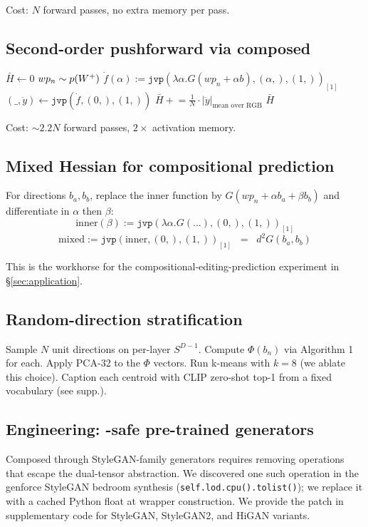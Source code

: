 Cost: $N$ forward passes, no extra memory per pass.

\subsection{Second-order pushforward via composed \jvp}
\begin{algorithmic}
\STATE $\bar H \leftarrow 0$
  \STATE $wp_n \sim p(W^+)$
  \STATE $\dot f(\alpha) := \texttt{jvp}(\lambda\alpha. G(wp_n + \alpha b), (\alpha,), (1,))_{[1]}$
  \STATE $(\_, \ddot y) \leftarrow \texttt{jvp}(\dot f, (0,), (1,))$
  \STATE $\bar H \mathrel{+}= \tfrac{1}{N} \cdot |\ddot y|_{\text{mean over RGB}}$
\ENDFOR
\RETURN $\bar H$
\end{algorithmic}

Cost: $\sim 2.2 N$ forward passes, $2\times$ activation memory.

\subsection{Mixed Hessian for compositional prediction}
For directions $b_a, b_b$, replace the inner function by
$G(wp_n + \alpha b_a + \beta b_b)$ and differentiate in $\alpha$ then
$\beta$:
\begin{equation*}
  \mathrm{inner}(\beta) := \texttt{jvp}(\lambda \alpha. G(\ldots), (0,), (1,))_{[1]}
\end{equation*}
\begin{equation*}
  \mathrm{mixed} := \texttt{jvp}(\mathrm{inner}, (0,), (1,))_{[1]} \;\;=\;\; d^2 G(b_a, b_b)
\end{equation*}

This is the workhorse for the compositional-editing-prediction
experiment in \S\ref{sec:application}.

\subsection{Random-direction stratification}
\begin{algorithmic}
\STATE Sample $N$ unit directions on per-layer $S^{D-1}$.
\STATE Compute $\Phi(b_n)$ via Algorithm 1 for each.
\STATE Apply PCA-32 to the $\Phi$ vectors.
\STATE Run k-means with $k = 8$ (we ablate this choice).
\STATE Caption each centroid with CLIP zero-shot top-1 from a fixed
       vocabulary (see supp.).
\end{algorithmic}

\subsection{Engineering: \jvp-safe pre-trained generators}
Composed \jvp through StyleGAN-family generators requires removing
operations that escape the dual-tensor abstraction. We discovered
one such operation in the genforce StyleGAN bedroom synthesis
(\texttt{self.lod.cpu().tolist()}); we replace it with a cached
Python float at wrapper construction. We provide the patch in
supplementary code for StyleGAN, StyleGAN2, and HiGAN variants.

